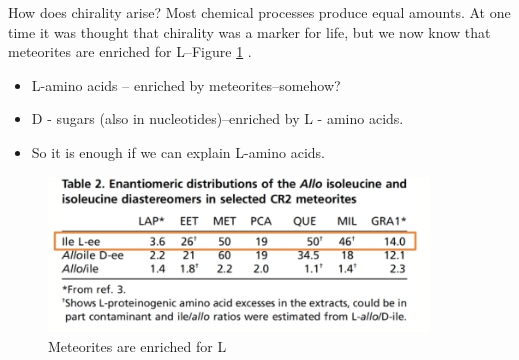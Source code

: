 \documentclass[]{article}
\begin{document}
How does chirality arise? Most chemical processes produce equal amounts. At one time it was thought that chirality was a marker for life, but we now know that meteorites are enriched for L--Figure \ref{fig:Chirality2}  \cite{pizzarello2012large}.
\begin{itemize}
	\item L-amino acids – enriched by meteorites--somehow?
	\item D - sugars (also in nucleotides)--enriched by L - amino acids.
	\item So it is enough if we can explain L-amino acids.
\end{itemize}
\begin{figure}[H]
	\caption{Meteorites are enriched for L} \label{fig:Chirality2} 
	\includegraphics[width=0.9\textwidth]{Chirality2}
\end{figure}
\end{document}
